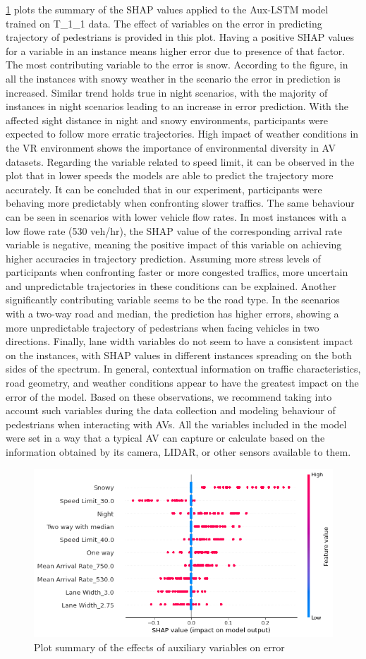 \cref{fig:Tshap} plots the summary of the SHAP values applied to the Aux-LSTM model trained on T\_1\_1 data. The effect of variables on the error in predicting trajectory of pedestrians is provided in this plot. Having a positive SHAP values for a variable in an instance means higher error due to presence of that factor. The most contributing variable to the error is snow. According to the figure, in all the instances with snowy weather in the scenario the error in prediction is increased. Similar trend holds true in night scenarios, with the majority of instances in night scenarios leading to an increase in error prediction. With the affected sight distance in night and snowy environments, participants were expected to follow more erratic trajectories. High impact of weather conditions in the VR environment shows the importance of environmental diversity in AV datasets. Regarding the variable related to speed limit, it can be observed in the plot that in lower speeds the models are able to predict the trajectory more accurately. It can be concluded that in our experiment, participants were behaving more predictably when confronting slower traffics. The same behaviour can be seen in scenarios with lower vehicle flow rates. In most instances with a low flowe rate (530 veh/hr), the SHAP value of the corresponding arrival rate variable is negative, meaning the positive impact of this variable on achieving higher accuracies in trajectory prediction. Assuming more stress levels of participants when confronting faster or more congested traffics, more uncertain and unpredictable trajectories in these conditions can be explained. Another significantly contributing variable seems to be the road type. In the scenarios with a two-way road and median, the prediction has higher errors, showing a more unpredictable trajectory of pedestrians when facing vehicles in two directions. Finally, lane width variables do not seem to have a consistent impact on the instances, with SHAP values in different instances spreading on the both sides of the spectrum. In general, contextual information on traffic characteristics, road geometry, and weather conditions appear to have the greatest impact on the error of the model. Based on these observations, we recommend taking into account such variables during the data collection and modeling behaviour of pedestrians when interacting with AVs. All the variables included in the model were set in a way that a typical AV can capture or calculate based on the information obtained by its camera, LIDAR, or other sensors available to them.

\begin{figure}
    \centering
    \includegraphics[scale=0.6]{chapter_6/figures/shaptraj2.png}
    \caption{Plot summary of the effects of auxiliary variables on error}
    \label{fig:Tshap}
\end{figure}

